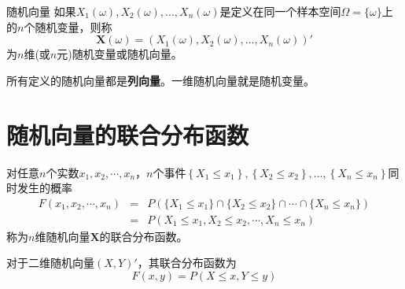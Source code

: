 \begin{definition}{随机向量}
如果$X_{1}(\omega),X_{2}(\omega),...,X_{n}(\omega)$是定义在同一个样本空间$\Omega=\{\omega\}$上的$n$个随机变量，则称
$$\bm{X}(\omega)=\left(X_{1}(\omega), X_{2}(\omega), \ldots, X_{n}(\omega)\right)'$$
为$n$维(或$n$元)随机变量或随机向量。
\end{definition}

\begin{remark}
    所有定义的随机向量都是\textbf{列向量}。一维随机向量就是随机变量。
\end{remark}



\section{随机向量的联合分布函数}
\begin{definition}
对任意$n$个实数$x_{1}, x_{2}, \cdots, x_{n}$，$n$个事件$\left\{X_{1} \leqslant x_{1}\right\},\left\{X_{2} \leqslant x_{2}\right\},...,\left\{X_{n} \leqslant x_{n}\right\}$同时发生的概率
\begin{eqnarray*}
F\left(x_{1}, x_{2}, \cdots, x_{n}\right)&=&P\left( \{X_{1} \leqslant x_{1}\} \cap \{X_{2} \leqslant x_{2}\}\cap \cdots\cap \{X_{n} \leqslant x_{n}\}\right)\\
&=& P\left(X_{1} \leq x_1, X_2 \leq x_2,\cdots,X_n \leq x_{n}\right)
\end{eqnarray*}
称为$n$维随机向量$\bm{X}$的联合分布函数。
\end{definition}
\begin{remark}
    对于二维随机向量$(X,Y)'$，其联合分布函数为
    $$
    F(x,y) = P(X\leq x, Y\leq y)
    $$
\end{remark}

